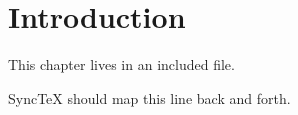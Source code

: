 \section{Introduction}
This chapter lives in an included file.

SyncTeX should map this line back and forth.
